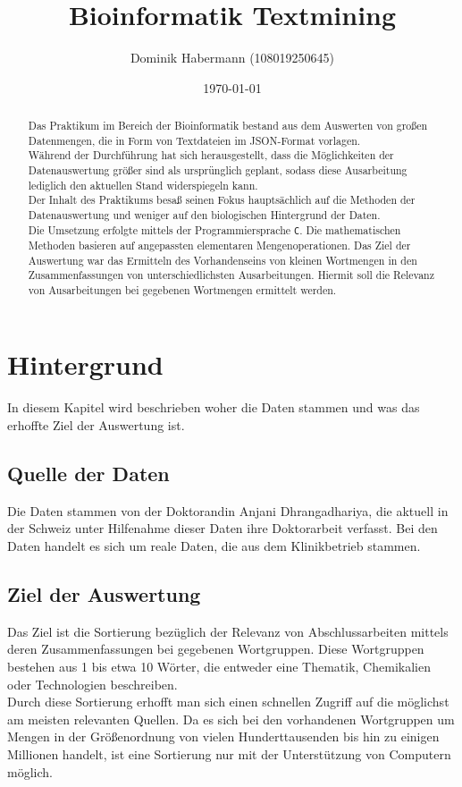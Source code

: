 \documentclass[a4paper,10pt]{article}
\title{Bioinformatik Textmining}
\author{Dominik Habermann (108019250645)}
\date{\today}
\newcommand{\dataSource}[0]{Anjani Dhrangadhariya}
\begin{document}
\maketitle

\begin{abstract}
    Das Praktikum im Bereich der Bioinformatik bestand aus dem Auswerten von großen Datenmengen, die in Form von Textdateien im JSON-Format vorlagen.\\
    Während der Durchführung hat sich herausgestellt, dass die Möglichkeiten der Datenauswertung größer sind als ursprünglich geplant, sodass diese Ausarbeitung lediglich den aktuellen Stand widerspiegeln kann.\\
    Der Inhalt des Praktikums besaß seinen Fokus hauptsächlich auf die Methoden der Datenauswertung und weniger auf den biologischen Hintergrund der Daten.\\

    Die Umsetzung erfolgte mittels der Programmiersprache \texttt{C}. Die mathematischen Methoden basieren auf angepassten elementaren Mengenoperationen. Das Ziel der Auswertung war das Ermitteln des Vorhandenseins von kleinen Wortmengen in den Zusammenfassungen von unterschiedlichsten Ausarbeitungen. Hiermit soll die Relevanz von Ausarbeitungen bei gegebenen Wortmengen ermittelt werden.
\end{abstract}

\section{Hintergrund}
    In diesem Kapitel wird beschrieben woher die Daten stammen und was das erhoffte Ziel der Auswertung ist.

    \subsection{Quelle der Daten}
        Die Daten stammen von der Doktorandin \dataSource, die aktuell in der Schweiz unter Hilfenahme dieser Daten ihre Doktorarbeit verfasst. Bei den Daten handelt es sich um reale Daten, die aus dem Klinikbetrieb stammen.

    \subsection{Ziel der Auswertung}
        Das Ziel ist die Sortierung bezüglich der Relevanz von Abschlussarbeiten mittels deren Zusammenfassungen bei gegebenen Wortgruppen. Diese Wortgruppen bestehen aus 1 bis etwa 10 Wörter, die entweder eine Thematik, Chemikalien oder Technologien beschreiben.\\
        Durch diese Sortierung erhofft man sich einen schnellen Zugriff auf die möglichst am meisten relevanten Quellen. Da es sich bei den vorhandenen Wortgruppen um Mengen in der Größenordnung von vielen Hunderttausenden bis hin zu einigen Millionen handelt, ist eine Sortierung nur mit der Unterstützung von Computern möglich.
\end{document}
